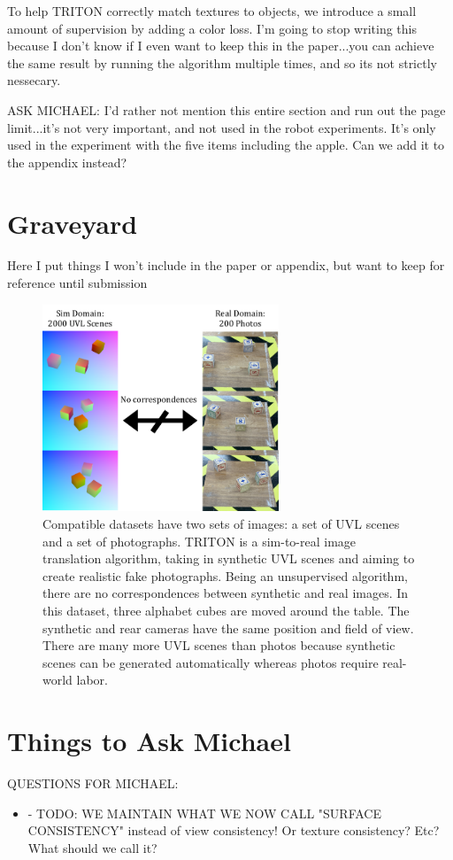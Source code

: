 \documentclass{article}
\begin{document}
		To help TRITON correctly match textures to objects, we introduce a small amount of supervision by adding a color loss. I'm going to stop writing this because I don't know if I even want to keep this in the paper...you can achieve the same result by running the algorithm multiple times, and so its not strictly nessecary.

		ASK MICHAEL: I'd rather not mention this entire section and run out the page limit...it's not very important, and not used in the robot experiments. It's only used in the experiment with the five items including the apple. Can we add it to the appendix instead?


\section*{Graveyard}

Here I put things I won't include in the paper or appendix, but want to keep for reference until submission

\begin{figure}[H]
	\begin{center}
		\includegraphics[width=200pt]{../images/dataset_explanation.pdf}
	\end{center}
	\caption{
		Compatible datasets have two sets of images: a set of UVL scenes and a set of photographs.
		TRITON is a sim-to-real image translation algorithm, taking in synthetic UVL scenes and aiming to create realistic fake photographs. 
		Being an unsupervised algorithm, there are no correspondences between synthetic and real images.
		In this dataset, three alphabet cubes are moved around the table. 
		The synthetic and rear cameras have the same position and field of view.
		There are many more UVL scenes than photos because synthetic scenes can be generated automatically whereas photos require real-world labor.
		}
	\label{fig:dataset_explanation}
\end{figure}


\section*{Things to Ask Michael}


QUESTIONS FOR MICHAEL:
\begin{itemize}
	\item - TODO: WE MAINTAIN WHAT WE NOW CALL "SURFACE CONSISTENCY" instead of view consistency! Or texture consistency? Etc? What should we call it?
\end{itemize}
\end{document}
